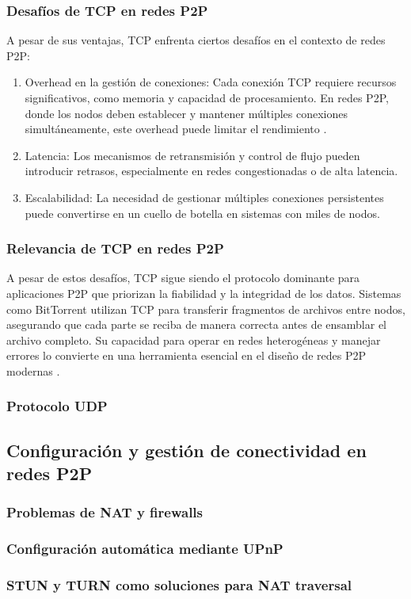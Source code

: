 \subsubsection*{Desafíos de TCP en redes P2P}
A pesar de sus ventajas, TCP enfrenta ciertos desafíos en el contexto de redes P2P:

\begin{enumerate}
\item Overhead en la gestión de conexiones: Cada conexión TCP requiere recursos significativos, como memoria y capacidad de procesamiento. En redes P2P, donde los nodos deben establecer y mantener múltiples conexiones simultáneamente, este overhead puede limitar el rendimiento \cite{cohen2003}.
\item Latencia: Los mecanismos de retransmisión y control de flujo pueden introducir retrasos, especialmente en redes congestionadas o de alta latencia.
\item Escalabilidad: La necesidad de gestionar múltiples conexiones persistentes puede convertirse en un cuello de botella en sistemas con miles de nodos.
\end{enumerate}
\subsubsection*{Relevancia de TCP en redes P2P}
A pesar de estos desafíos, TCP sigue siendo el protocolo dominante para aplicaciones P2P que priorizan la fiabilidad y la integridad de los datos. Sistemas como BitTorrent utilizan TCP para transferir fragmentos de archivos entre nodos, asegurando que cada parte se reciba de manera correcta antes de ensamblar el archivo completo. Su capacidad para operar en redes heterogéneas y manejar errores lo convierte en una herramienta esencial en el diseño de redes P2P modernas \cite{cohen2003}.


\subsubsection{Protocolo UDP}

\subsection{Configuración y gestión de conectividad en redes P2P}
\subsubsection{Problemas de NAT y firewalls}
\subsubsection{Configuración automática mediante UPnP}
\subsubsection{STUN y TURN como soluciones para NAT traversal}
